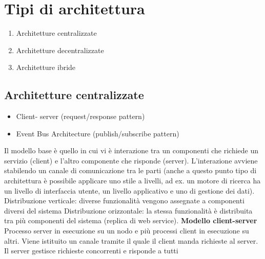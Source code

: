 \documentclass[12pt,italian]{report}
\begin{document}
\section{Tipi di architettura}
\begin{enumerate}
    \item Architetture centralizzate
    \item Architetture decentralizzate
    \item Architetture ibride
\end{enumerate}

\subsection{Architetture centralizzate}
\begin{itemize}
    \item Client- server (request/response pattern)
    \item Event Bus Architecture (publish/subscribe pattern)
\end{itemize}
Il modello base è quello in cui vi è interazione tra un componenti che richiede un servizio (client) e l'altro componente che risponde (server). L'interazione avviene stabilendo un canale di comunicazione tra le parti (anche a questo punto tipo di architettura è possibile applicare uno stile a livelli, ad ex. un motore di ricerca ha un livello di interfaccia utente, un livello applicativo e uno di gestione dei dati). 
\bigbreak
\noindent Distribuzione verticale: diverse funzionalità vengono assegnate a componenti diversi del sistema 
\bigbreak
\noindent Distribuzione orizzontale: la stessa funzionalità è distribuita tra più componenti del sistema (replica di web service). 
\bigbreak
\noindent \textbf{Modello client-server} 
\bigbreak
Processo server in esecuzione su un nodo e più processi client in esecuzione su altri. Viene istituito un canale tramite il quale il client manda richieste al server. Il server gestisce richieste concorrenti e risponde a tutti
\end{document}
